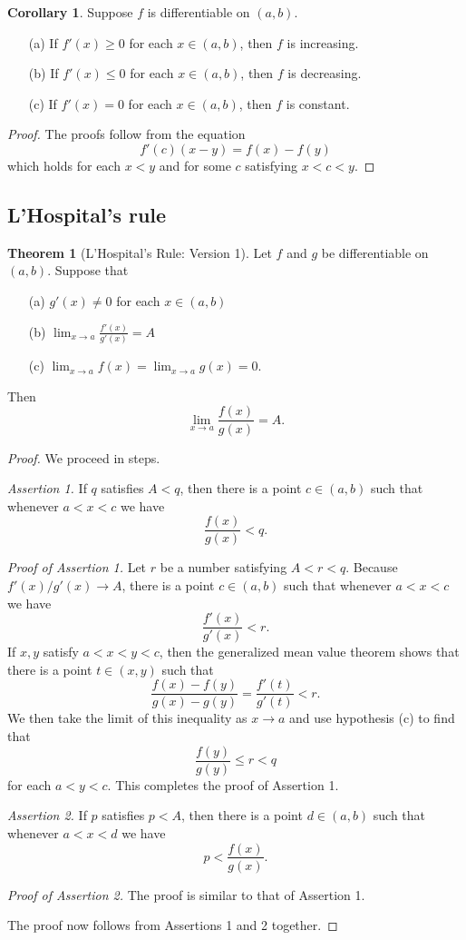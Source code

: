\documentclass[12pt]{article}
\theoremstyle{definition}
\theoremstyle{theorem}
\newtheorem{theorem}[definition]{Theorem}
\newtheorem{corollary}[definition]{Corollary}
\begin{document}
\begin{corollary}
Suppose $f$ is differentiable on $(a,b)$. 
\begin{enumerate}
\item[(a)] If $f'(x) \geqslant 0$ for each $x \in (a,b)$, then $f$ is increasing.
\item[(b)] If $f'(x) \leqslant 0$ for each $x \in (a,b)$, then $f$ is decreasing. 
\item[(c)] If $f'(x) = 0$ for each $x \in (a,b)$, then $f$ is constant. 
\end{enumerate}
\end{corollary}

\begin{proof}
The proofs follow from the equation 
\[
f'(c) (x - y) = f(x) - f(y)
\]
which holds for each $x < y$ and for some $c$ satisfying $x < c < y$. 
\end{proof}


\subsection{L'Hospital's rule}

\begin{theorem}[L'Hospital's Rule: Version 1]
Let $f$ and $g$ be differentiable on $(a,b)$. Suppose that 
\begin{enumerate}
\item[(a)] $g'(x) \ne 0$ for each $x \in (a,b)$
\item[(b)] $\lim_{x \to a} \frac{f'(x)}{g'(x)} = A$
\item[(c)] $\lim_{x \to a}f(x) = \lim_{x \to a}g(x) = 0$.
\end{enumerate}
Then 
\[
\lim_{x \to a}\frac{f(x)}{g(x)} = A.
\]
\end{theorem}

\begin{proof}
We proceed in steps. 

\noindent \emph{Assertion 1.} If $q$ satisfies $A < q$, then there is a point $c \in (a,b)$ such that whenever $a < x < c$ we have
\[
\frac{f(x)}{g(x)} < q.
\] 

\noindent \emph{Proof of Assertion 1.} Let $r$ be a number satisfying $A < r < q$. Because $f'(x)/g'(x) \to A$, there is a point $c \in (a,b)$ such that whenever $a < x < c$ we have 
\[
\frac{f'(x)}{g'(x)} < r.
\]
If $x,y$ satisfy $a < x < y < c$, then the generalized mean value theorem shows that there is a point $t \in (x,y)$ such that 
\[
\frac{f(x) - f(y)}{g(x) - g(y)} = \frac{f'(t)}{g'(t)} < r.
\]
We then take the limit of this inequality as $x \to a$ and use hypothesis (c) to find that 
\[
\frac{f(y)}{g(y)} \leqslant r < q
\]
for each $a<y<c$. This completes the proof of Assertion 1. 



\noindent \emph{Assertion 2.} If $p$ satisfies $p < A$, then there is a point $d \in (a,b)$ such that whenever $a < x < d$ we have  
\[
p < \frac{f(x)}{g(x)}.
\]


\noindent \emph{Proof of Assertion 2.} The proof is similar to that of Assertion 1. 

The proof now follows from Assertions 1 and 2 together. 
\end{proof}
\end{document}
